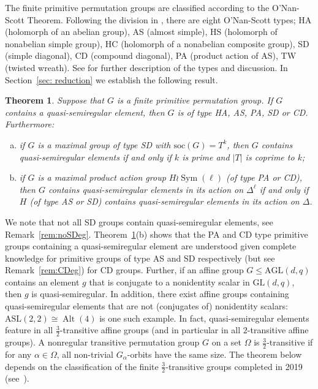 \documentclass{article}
\newtheorem{thm}{Theorem}[section]
\theoremstyle{remark}
\theoremstyle{definition}
\DeclareMathOperator{\Alt}{Alt}
\DeclareMathOperator{\Sym}{Sym}
\newcommand{\soc}{\mathrm{soc}}
\newcommand{\AGL}{\mathrm{AGL}}
\newcommand{\GL}{\mathrm{GL}}
\newcommand{\qsr}{quasi-semiregular}
\newcommand{\qsre}{quasi-semiregular element}
\newcommand{\qsres}{quasi-semiregular elements}
\begin{document}
The finite primitive permutation groups are classified according to the O'Nan-Scott Theorem. Following the division in \cite{PraegerPrimInc}, there are eight O'Nan-Scott types;  HA (holomorph of an abelian group), AS (almost simple), HS (holomorph of nonabelian simple group), HC (holomorph of a nonabelian composite group), SD (simple diagonal), CD (compound diagonal), PA (product action of AS), TW (twisted wreath). See \cite[Section 3]{PraegerPrimInc} for further description of the types and discussion.
In Section~\ref{sec: reduction} we establish the following result.

\begin{thm}
\label{introthm:prims}
    Suppose that $G$ is a finite primitive permutation group. If $G$ contains a {\qsre}, then $G$ is of type HA, AS, PA, SD or CD.  Furthermore:
    \begin{enumerate}[(a)]
    \item if $G$ is a maximal group of  type SD with $\soc(G)=T^k$, then $G$ contains {\qsres} if and only if $k$ is prime and $|T|$ is coprime to $k$;
    \item if $G$ is a maximal product action  group $H \wr \Sym(\ell)$ (of type PA or CD), then $G$ contains {\qsres} in its action on $\Delta^\ell$ if and  only if $H$ (of type AS or SD) contains {\qsres} in its action on $\Delta$.
    \end{enumerate} 
 \end{thm}

We note that not all SD groups contain {\qsres}, see Remark~\ref{rem:noSDeg}. Theorem~\ref{introthm:prims}(b) shows that  the PA  and CD type primitive groups containing a {\qsre} are   understood   given complete knowledge for primitive groups of type AS and SD respectively (but see Remark~\ref{rem:CDeg}) for CD groups. Further, if an affine group $G\leqslant \AGL(d,q)$ contains an element $g$ that is conjugate to a nonidentity scalar in $\GL(d,q)$, then $g$ is {\qsr}. In addition, there exist affine groups containing {\qsres}  that are not (conjugates of) nonidentity scalars: $\mathrm{ASL}(2,2)\cong \Alt(4)$ is one such example.    In fact,  {\qsres} feature in all $\frac{3}{2}$-transitive affine groups (and in particular in all $2$-transitive affine groups). A nonregular transitive permutation group $G$ on a set $\Omega$ is $\frac{3}{2}$-transitive if  for any $\alpha\in \Omega$, all non-trivial $G_\alpha$-orbits have the same size. 
The theorem below depends on the classification of the finite $\frac{3}{2}$-transitive groups completed in 2019 (see~\cite{LPS2019}).  
\end{document}
